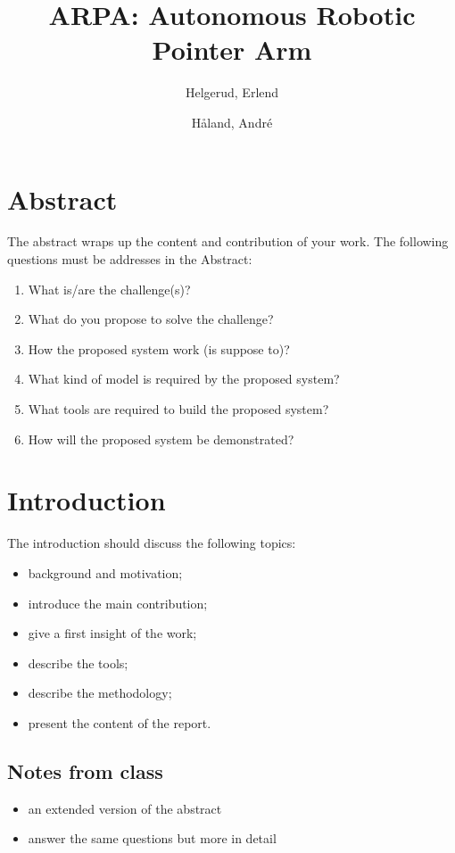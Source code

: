 \documentclass[11pt,a4paper]{report}
\title{ARPA: Autonomous Robotic Pointer Arm}
\author{Helgerud, Erlend \and Håland, André}
\begin{document}
	\maketitle
	\tableofcontents
	\newpage

	\section{Abstract}
	The abstract wraps up the content and contribution of your work. The following questions must be addresses in the Abstract:
	\begin{enumerate}
		\item What is/are the challenge(s)?
		\item What do you propose to solve the challenge?
		\item How the proposed system work (is suppose to)?
		\item What kind of model is required by the proposed system?
		\item What tools are required to build the proposed system?
		\item How will the proposed system be demonstrated?
	\end{enumerate}
	
	
	\section{Introduction}
	The introduction should discuss the following topics:
	\begin{itemize}
		\item background and motivation;
		\item introduce the main contribution;
		\item give a first insight of the work;
		\item describe the tools;
		\item describe the methodology;
		\item present the content of the report.
	\end{itemize}
	
	\subsection{Notes from class}
	
	\begin{itemize}
		\item an extended version of the abstract
		\item answer the same questions but more in detail
	\end{itemize}
\end{document}
